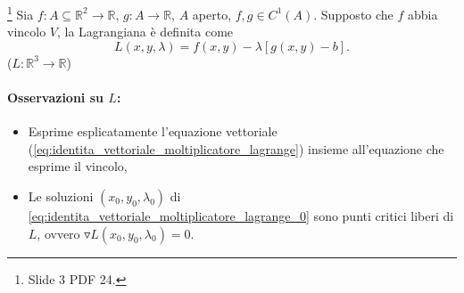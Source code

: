 \begin{definition}[Lagrangiana]\footnote{Slide 3 PDF 24.}
	Sia $f:A\subseteq\mathbb{R}^2\rightarrow\mathbb{R},\, g:A\rightarrow\mathbb{R}$, $A$ aperto, $f,g\in C^1(A)$. Supposto che $f$ abbia vincolo $V$, la Lagrangiana è definita come
	\begin{equation}\label{eq:lagrangiana}
		L(x,y,\lambda) = f(x,y) - \lambda[g(x,y) - b].
	\end{equation}
	($L:\mathbb{R}^3\rightarrow\mathbb{R}$)
\end{definition}

\paragraph{Osservazioni su $L$:}
\begin{itemize}
	\item Esprime esplicatamente l'equazione vettoriale (\ref{eq:identita_vettoriale_moltiplicatore_lagrange}) insieme all'equazione che esprime il vincolo,
	\item Le soluzioni $(x_0,y_0,\lambda_0)$ di \ref{eq:identita_vettoriale_moltiplicatore_lagrange_0} sono punti critici liberi di $L$, ovvero $\triangledown L(x_0,y_0,\lambda_0) = 0$.
\end{itemize} 

